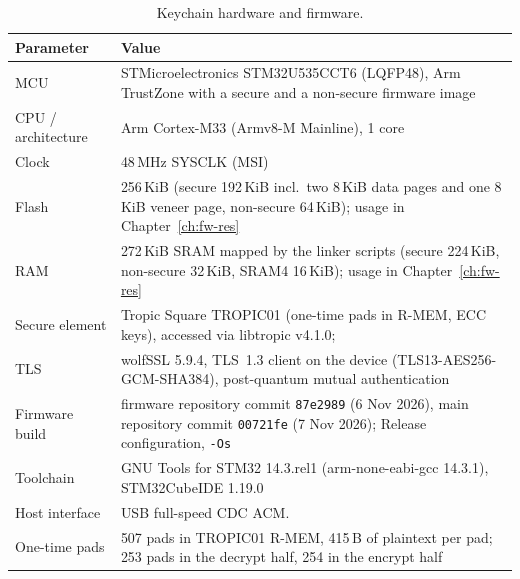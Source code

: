 \documentclass[11pt,a4paper]{report}
\begin{document}
\begin{table}[htbp]
\centering\small
\begin{tabular}{p{}p{}}
\toprule
Parameter & Value \\
\midrule
MCU & STMicroelectronics STM32U535CCT6 (LQFP48), Arm TrustZone with a secure and a non-secure firmware image \\
CPU / architecture & Arm Cortex-M33 (Armv8-M Mainline), 1 core \\
Clock & 48\,MHz SYSCLK (MSI) \\
Flash & 256\,KiB (secure 192\,KiB incl.\ two 8\,KiB data pages and one 8\,KiB veneer page, non-secure 64\,KiB); usage in Chapter~\ref{ch:fw-res} \\
RAM & 272\,KiB SRAM mapped by the linker scripts (secure 224\,KiB, non-secure 32\,KiB, SRAM4 16\,KiB); usage in Chapter~\ref{ch:fw-res} \\
Secure element & Tropic Square TROPIC01 (one-time pads in R-MEM, ECC keys), accessed via libtropic v4.1.0; \\
TLS & wolfSSL 5.9.4, TLS~1.3 client on the device (TLS13-AES256-GCM-SHA384), post-quantum mutual authentication \\
Firmware build & firmware repository commit \texttt{87e2989} (6 Nov 2026), main repository commit \texttt{00721fe} (7 Nov 2026); Release configuration, \texttt{-Os} \\
Toolchain & GNU Tools for STM32 14.3.rel1 (arm-none-eabi-gcc 14.3.1), STM32CubeIDE 1.19.0 \\
Host interface & USB full-speed CDC ACM. \\
One-time pads & 507 pads in TROPIC01 R-MEM, 415\,B of plaintext per pad; 253 pads in the decrypt half, 254 in the encrypt half \\
\bottomrule
\end{tabular}
\caption{Keychain hardware and firmware.}
\label{tab:hw-se}
\end{table}
\clearpage{}
\end{document}
